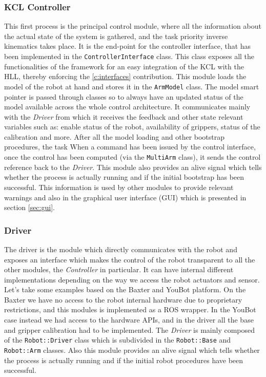 \subsubsection{KCL Controller}
This first process is the principal control module, where all the information about the actual state of the system is gathered, and the task priority inverse kinematics takes place. It is the end-point for the controller interface, that has been implemented in the \texttt{ControllerInterface} class. This class exposes all the functionalities of the framework for an easy integration of the KCL with the HLL, thereby enforcing the \ref{c:interfaces} contribution.
This module loads the model of the robot at hand and stores it in the \texttt{ArmModel} class. The model smart pointer is passed through classes so to always have an updated status of the model available across the whole control architecture. It communicates mainly with the \textit{Driver} from which it receives the feedback and other state relevant variables such as: enable status of the robot, availability of grippers, status of the calibration and more. After all the model loading and other bootstrap procedures, the task  When a command has been issued by the control interface, once the control has been computed (via the \texttt{MultiArm} class), it sends the control reference back to the \textit{Driver}.
This module also provides an alive signal which tells whether the process is actually running and if the initial bootstrap has been successful. This information is used by other modules to provide relevant warnings and also in the graphical user interface (GUI) which is presented in section \ref{sec:gui}.

\subsubsection{Driver}
The driver is the module which directly communicates with the robot and exposes an interface which makes the control of the robot transparent to all the other modules, the \textit{Controller} in particular. It can have internal different implementations depending on the way we access the robot actuators and sensor. Let's take some examples based on the Baxter and YouBot platform. On the Baxter we have no access to the robot internal hardware due to proprietary restrictions, and this modules is implemented as a ROS wrapper. In the YouBot case instead we had access to the hardware APIs, and in the driver all the base and gripper calibration had to be implemented. The \textit{Driver} is mainly composed of the \texttt{Robot::Driver} class which is subdivided in the \texttt{Robot::Base} and \texttt{Robot::Arm} classes.
Also this module provides an alive signal which tells whether the process is actually running and if the initial robot procedures have been successful.

